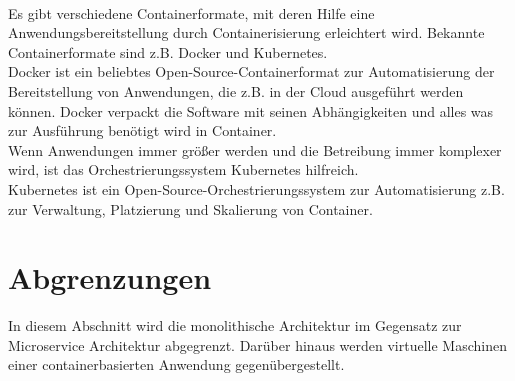 \\                                                                                   
Es gibt verschiedene Containerformate, mit deren Hilfe eine Anwendungsbereitstellung durch Containerisierung erleichtert wird. Bekannte Containerformate sind z.B. Docker und Kubernetes.\\
Docker ist ein beliebtes Open-Source-Containerformat zur Automatisierung der Bereitstellung von Anwendungen, die z.B. in der Cloud ausgeführt werden können. Docker verpackt die Software mit seinen Abhängigkeiten und alles was zur Ausführung benötigt wird in Container.\\
Wenn Anwendungen immer größer werden und die Betreibung immer komplexer wird, ist das Orchestrierungssystem Kubernetes hilfreich.\\
Kubernetes ist ein Open-Source-Orchestrierungssystem zur Automatisierung z.B. zur Verwaltung, Platzierung und Skalierung von Container.\cite{kubernetes}
                   
\section{Abgrenzungen}
In diesem Abschnitt wird die monolithische Architektur im Gegensatz zur Microservice Architektur abgegrenzt. Darüber hinaus werden virtuelle Maschinen einer containerbasierten Anwendung gegenübergestellt.

